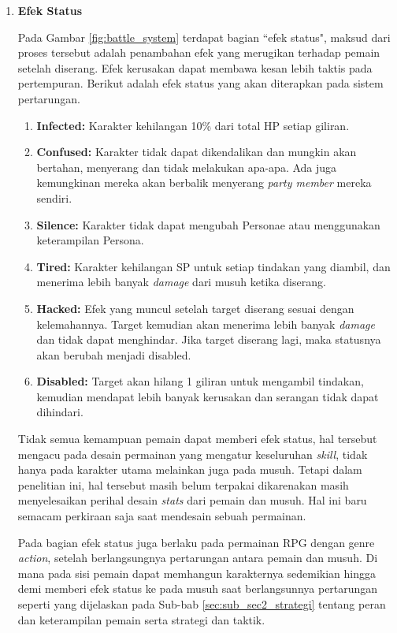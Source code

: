 \begin{subs}
\begin{enumerate}[label=\textbf{\arabic*).}]
		\item \textbf{Efek Status}
		
		Pada Gambar \ref{fig:battle_system} terdapat bagian ``efek status", maksud dari proses tersebut adalah penambahan efek yang merugikan terhadap pemain setelah diserang. Efek kerusakan dapat membawa kesan lebih taktis pada pertempuran. Berikut adalah efek status yang akan diterapkan pada sistem pertarungan.
		
		\begin{enumerate}[label=\alph*).]
			\item \textbf{Infected:} Karakter kehilangan 10\% dari total HP setiap giliran.
			
			\item \textbf{Confused:} Karakter tidak dapat dikendalikan dan mungkin akan bertahan, menyerang dan tidak melakukan apa-apa. Ada juga kemungkinan mereka akan berbalik menyerang \textit{party member} mereka sendiri.
			
			\item \textbf{Silence:} Karakter tidak dapat mengubah Personae atau menggunakan keterampilan Persona.
			
			\item \textbf{Tired:} Karakter kehilangan SP untuk setiap tindakan yang diambil, dan menerima lebih banyak \textit{damage} dari musuh ketika diserang.
			
			\item \textbf{Hacked:} Efek yang muncul setelah target diserang sesuai dengan kelemahannya. Target kemudian akan menerima lebih banyak \textit{damage} dan tidak dapat menghindar. Jika target diserang lagi, maka statusnya akan berubah menjadi disabled.
			
			\item \textbf{Disabled:} Target akan hilang 1 giliran untuk mengambil tindakan, kemudian mendapat lebih banyak kerusakan dan serangan tidak dapat dihindari.
		\end{enumerate}
		
		Tidak semua kemampuan pemain dapat memberi efek status, hal tersebut mengacu pada desain permainan yang mengatur keseluruhan \textit{skill}, tidak hanya pada karakter utama melainkan juga pada musuh. Tetapi dalam penelitian ini, hal tersebut masih belum terpakai dikarenakan masih menyelesaikan perihal desain \textit{stats} dari pemain dan musuh. Hal ini baru semacam perkiraan saja saat mendesain sebuah permainan.
		\vspace{1ex}
		
		Pada bagian efek status juga berlaku pada permainan RPG dengan genre \textit{action}, setelah berlangsungnya pertarungan antara pemain dan musuh. Di mana pada sisi pemain dapat memhangun karakternya sedemikian hingga demi memberi efek status ke pada musuh saat berlangsunnya pertarungan seperti yang dijelaskan pada Sub-bab \ref{sec:sub_sec2_strategi} tentang peran dan keterampilan pemain serta strategi dan taktik.
		\vspace{1ex}
		

\end{enumerate}
\end{subs}
